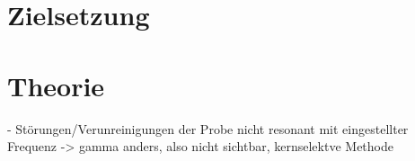 \section{Zielsetzung}
\label{sec:Zielsetzung}

\section{Theorie}
\label{sec:Theorie}

- Störungen/Verunreinigungen der Probe nicht resonant mit eingestellter Frequenz
  -> gamma anders, also nicht sichtbar, kernselektve Methode



